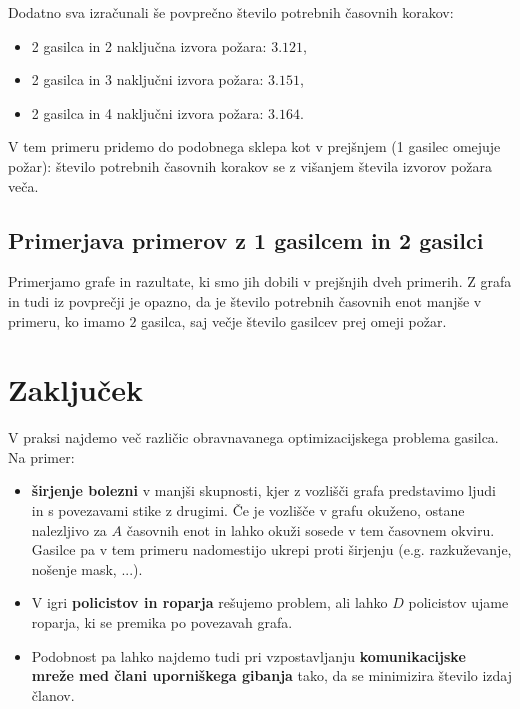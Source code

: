 \documentclass[a4paper, 12pt]{article}
\begin{document}
\begin{figure}[!htb]
    \endminipage
\end{figure}

\pagebreak

\noindent Dodatno sva izračunali še povprečno število potrebnih časovnih korakov:
\begin{itemize}
    \item 2 gasilca in 2 naključna izvora požara: $3.121$,
    \item 2 gasilca in 3 naključni izvora požara: $3.151$,
    \item 2 gasilca in 4 naključni izvora požara: $3.164$.
\end{itemize}

\noindent V tem primeru pridemo do podobnega sklepa kot v prejšnjem (1 gasilec omejuje požar):
število potrebnih časovnih korakov se z višanjem števila izvorov požara veča. 

\subsection{Primerjava primerov z 1 gasilcem in 2 gasilci}
Primerjamo grafe in razultate, ki smo jih dobili v prejšnjih dveh primerih.
Z grafa in tudi iz povprečji je opazno, da je število potrebnih časovnih enot manjše v primeru, ko
imamo $2$ gasilca, saj večje število gasilcev prej omeji požar. 

\pagebreak
\section{Zaključek}

V praksi najdemo več različic obravnavanega optimizacijskega problema gasilca. Na primer:
\begin{itemize}
    \item\textbf{širjenje bolezni} v manjši skupnosti, kjer z vozlišči grafa predstavimo ljudi 
    in s povezavami stike z drugimi. Če je vozlišče v grafu okuženo, ostane nalezljivo 
    za $A$ časovnih enot in lahko okuži sosede v tem časovnem okviru. Gasilce pa v tem
    primeru nadomestijo ukrepi proti širjenju (e.g. razkuževanje, nošenje mask, ...).
    \item V igri \textbf{policistov in roparja} rešujemo problem, ali lahko $D$ policistov ujame roparja, ki se 
    premika po povezavah grafa. 
    \item Podobnost pa lahko najdemo tudi pri vzpostavljanju \textbf{komunikacijske mreže med člani uporniškega gibanja}
    tako, da se minimizira število izdaj članov.
\end{itemize}
\end{document}

